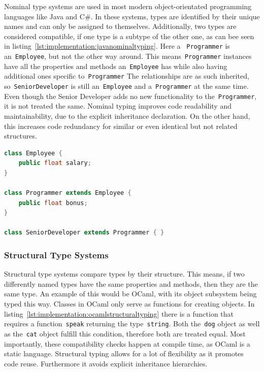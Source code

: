Nominal type systems are used in most modern object-orientated programming languages like Java and C\#. In these systems, types are identified by their unique names and can only be assigned to themselves. Additionally, two types are considered compatible, if one type is a subtype of the other one, as can bee seen in listing~\ref{lst:implementation:javanominaltyping}. Here a ~\lstinline|Programmer| is an~\lstinline|Employee|, but not the other way around. This means~\lstinline|Programmer| instances have all the properties and methods an~\lstinline|Employee| has while also having additional ones specific to~\lstinline|Programmer| The relationships are as such inherited, so~\lstinline|SeniorDeveloper| is still an~\lstinline|Employee| and a~\lstinline|Programmer| at the same time. Even though the Senior Developer adds no new functionality to the~\lstinline|Programmer|, it is not treated the same. Nominal typing improves code readability and maintainability, due to the explicit inheritance declaration. On the other hand, this increases code redundancy for similar or even identical but not related structures.

\begin{lstlisting}[language=Java,caption=Example of nominal typing in Java,label=lst:implementation:javanominaltyping]
class Employee {
	public float salary;
}

class Programmer extends Employee {
	public float bonus;
}

class SeniorDeveloper extends Programmer { }
\end{lstlisting}

\subsubsection{Structural Type Systems}

Structural type systems compare types by their structure. This means, if two differently named types have the same properties and methods, then they are the same type. An example of this would be OCaml, with its object subsystem being typed this way. Classes in OCaml only serve as functions for creating objects. In listing~\ref{lst:implementation:ocamlstructuraltyping} there is a function that requires a function~\lstinline|speak| returning the type~\lstinline|string|. Both the~\lstinline|dog| object as well as the~\lstinline|cat| object fulfill this condition, therefore both are treated equal. Most importantly, these compatibility checks happen at compile time, as OCaml is a static language. Structural typing allows for a lot of flexibility as it promotes code reuse. Furthermore it avoids explicit inheritance hierarchies.

